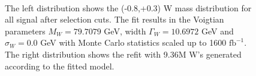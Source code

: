 \begin{figure}
\begin{minipage}{0.49\textwidth}
     \end{minipage}\\
     \caption{ The left distribution shows the (-0.8,+0.3) W mass distribution for all signal after selection cuts. The fit results in the Voigtian parameters $M_W = 79.7079$ GeV, width $\Gamma_W = 10.6972$ GeV and $\sigma_W = 0.0$ GeV with Monte Carlo statistics scaled up to 1600 $\text{fb}^{-1}$. The right distribution shows the refit with 9.36M W's generated according to the fitted model.}
\label{fig:badfit}


\end{figure}


